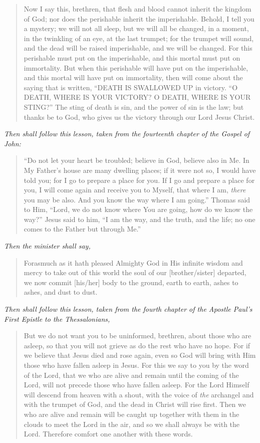 \documentclass[
]{book}
\begin{document}
\begin{quote}
Now I say this, brethren, that flesh and blood cannot inherit the kingdom of God; nor does the perishable inherit the imperishable. Behold, I tell you a mystery; we will not all sleep, but we will all be changed, in a moment, in the twinkling of an eye, at the last trumpet; for the trumpet will sound, and the dead will be raised imperishable, and we will be changed. For this perishable must put on the imperishable, and this mortal must put on immortality. But when this perishable will have put on the imperishable, and this mortal will have put on immortality, then will come about the saying that is written, ``DEATH IS SWALLOWED UP in victory. ``O DEATH, WHERE IS YOUR VICTORY? O DEATH, WHERE IS YOUR STING?'' The sting of death is sin, and the power of sin is the law; but thanks be to God, who gives us the victory through our Lord Jesus Christ.
\end{quote}

\emph{Then shall follow this lesson, taken from the fourteenth chapter of the Gospel of John:}

\begin{quote}
``Do not let your heart be troubled; believe in God, believe also in Me. In My Father's house are many dwelling places; if it were not so, I would have told you; for I go to prepare a place for you. If I go and prepare a place for you, I will come again and receive you to Myself, that where I am, \emph{there} you may be also. And you know the way where I am going.'' Thomas said to Him, ``Lord, we do not know where You are going, how do we know the way?'' Jesus said to him, ``I am the way, and the truth, and the life; no one comes to the Father but through Me.''
\end{quote}

\emph{Then the minister shall say,}

\begin{quote}
Forasmuch as it hath pleased Almighty God in His infinite wisdom and mercy to take out of this world the soul of our {[}brother/sister{]} departed, we now commit {[}his/her{]} body to the ground, earth to earth, ashes to ashes, and dust to dust.
\end{quote}

\emph{Then shall follow this lesson, taken from the fourth chapter of the Apostle Paul's First Epistle to the Thessalonians,}

\begin{quote}
But we do not want you to be uninformed, brethren, about those who are asleep, so that you will not grieve as do the rest who have no hope. For if we believe that Jesus died and rose again, even so God will bring with Him those who have fallen asleep in Jesus. For this we say to you by the word of the Lord, that we who are alive and remain until the coming of the Lord, will not precede those who have fallen asleep. For the Lord Himself will descend from heaven with a shout, with the voice of \emph{the} archangel and with the trumpet of God, and the dead in Christ will rise first. Then we who are alive and remain will be caught up together with them in the clouds to meet the Lord in the air, and so we shall always be with the Lord. Therefore comfort one another with these words.
\end{quote}
\end{document}
